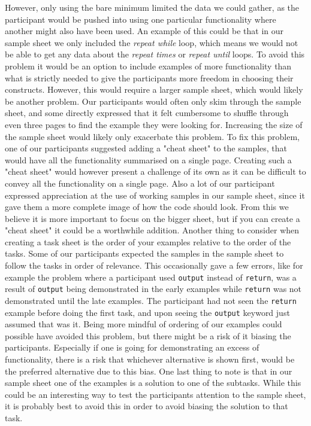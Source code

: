 However, only using the bare minimum limited the data we could gather, as the participant would be pushed into using one particular functionality where another might also have been used.
An example of this could be that in our sample sheet we only included the \textit{repeat while} loop, which means we would not be able to get any data about the \textit{repeat times} or \textit{repeat until} loops.
To avoid this problem it would be an option to include examples of more functionality than what is strictly needed to give the participants more freedom in choosing their constructs.
However, this would require a larger sample sheet, which would likely be another problem.
Our participants would often only skim through the sample sheet, and some directly expressed that it felt cumbersome to shuffle through even three pages to find the example they were looking for.
Increasing the size of the sample sheet would likely only exacerbate this problem.
To fix this problem, one of our participants suggested adding a "cheat sheet" to the samples, that would have all the functionality summarised on a single page.
Creating such a "cheat sheet" would however present a challenge of its own as it can be difficult to convey all the functionality on a single page.
Also a lot of our participant expressed appreciation at the use of working samples in our sample sheet, since it gave them a more complete image of how the code should look.
From this we believe it is more important to focus on the bigger sheet, but if you can create a "cheat sheet" it could be a worthwhile addition.
Another thing to consider when creating a task sheet is the order of your examples relative to the order of the tasks.
Some of our participants expected the samples in the sample sheet to follow the tasks in order of relevance.
This occasionally gave a few errors, like for example the problem where a participant used \lstinline!output! instead of \lstinline!return!, was a result of \lstinline!output! being demonstrated in the early examples while \lstinline!return! was not demonstrated until the late examples.
The participant had not seen the \lstinline!return! example before doing the first task, and upon seeing the \lstinline!output! keyword just assumed that was it.
Being more mindful of ordering of our examples could possible have avoided this problem, but there might be a risk of it biasing the participants.
Especially if one is going for demonstrating an excess of functionality, there is a risk that whichever alternative is shown first, would be the preferred alternative due to this bias.
One last thing to note is that in our sample sheet one of the examples is a solution to one of the subtasks.
While this could be an interesting way to test the participants attention to the sample sheet, it is probably best to avoid this in order to avoid biasing the solution to that task.